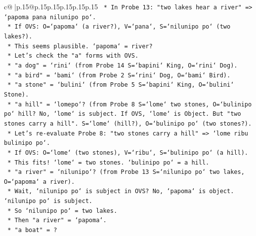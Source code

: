 \documentclass{article}
\begin{document}
{\begin{supertabular}{c@{$\;$}|p{.15\linewidth}@{}p{.15\linewidth}p{.15\linewidth}p{.15\linewidth}p{.15\linewidth}p{.15\linewidth}}
{{{\texttt{                                        *   In Probe 13: "two lakes hear a river" => `papoma pana nilunipo po`.} \\
\texttt{                                            *   If OVS: O=`papoma` (a river?), V=`pana`, S=`nilunipo po` (two lakes?).} \\
\texttt{                                            *   This seems plausible. `papoma` = river?} \\
\texttt{                                    *   Let's check the "a" forms with OVS.} \\
\texttt{                                        *   "a dog" = `rini` (from Probe 14 S=`bapini` King, O=`rini` Dog).} \\
\texttt{                                        *   "a bird" = `bami` (from Probe 2 S=`rini` Dog, O=`bami` Bird).} \\
\texttt{                                        *   "a stone" = `bulini` (from Probe 5 S=`bapini` King, O=`bulini` Stone).} \\
\texttt{                                        *   "a hill" = `lomepo`? (from Probe 8 S=`lome` two stones, O=`bulinipo po` hill? No, `lome` is subject. If OVS, `lome` is Object. But "two stones carry a hill". S=`lome` (hill?), O=`bulinipo po` (two stones?).} \\
\texttt{                                            *   Let's re{-}evaluate Probe 8: "two stones carry a hill" => `lome ribu bulinipo po`.} \\
\texttt{                                            *   If OVS: O=`lome` (two stones), V=`ribu`, S=`bulinipo po` (a hill).} \\
\texttt{                                            *   This fits! `lome` = two stones. `bulinipo po` = a hill.} \\
\texttt{                                        *   "a river" = `nilunipo`? (from Probe 13 S=`nilunipo po` two lakes, O=`papoma` a river).} \\
\texttt{                                            *   Wait, `nilunipo po` is subject in OVS? No, `papoma` is object. `nilunipo po` is subject.} \\
\texttt{                                            *   So `nilunipo po` = two lakes.} \\
\texttt{                                            *   Then "a river" = `papoma`.} \\
\texttt{                                        *   "a boat" = ?} \\
}}}
\end{supertabular}}
\end{document}
